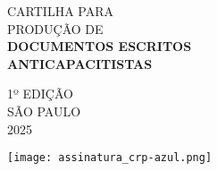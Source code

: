 \vspace*{\fill}
\begin{minipage}{0.3\textwidth}
    \hfill
\end{minipage}%
\begin{minipage}{0.7\textwidth}
\begin{flushleft}
\fininha\LARGE
\color{crp2}CARTILHA PARA\\PRODUÇÃO DE\\
\media\color{crp1}\textbf{DOCUMENTOS ESCRITOS\\ANTICAPACITISTAS}
\vspace*{2\baselineskip}

\color{crp3}
\Light
\normalsize
1º EDIÇÃO\\
SÃO PAULO\\
2025
\end{flushleft}
\end{minipage}
\vspace*{\baselineskip}
\begin{center}
    \texttt{[image: assinatura\_crp-azul.png]}
\end{center}
